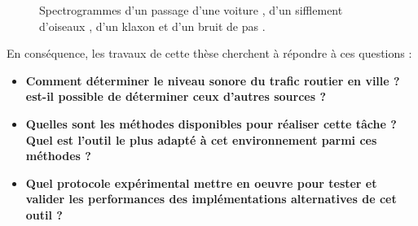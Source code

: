 \begin{figure}[t]
\centering
{}
\caption{Spectrogrammes d'un passage d'une voiture , d'un sifflement d'oiseaux , d'un klaxon  et d'un bruit de pas .}
\label{fig:sourceUrbain}
\end{figure}

En conséquence, les travaux de cette thèse cherchent à répondre à ces questions :
\begin{itemize}
\item \textbf{Comment déterminer le niveau sonore du trafic routier en ville ? est-il possible de déterminer ceux d'autres sources ?}
\item \textbf{Quelles sont les méthodes disponibles pour réaliser cette tâche ? Quel est l'outil le plus adapté à cet environnement parmi ces méthodes ?}
\item \textbf{Quel protocole expérimental mettre en oeuvre pour tester et valider les performances des implémentations alternatives de cet outil ?}
\end{itemize}


